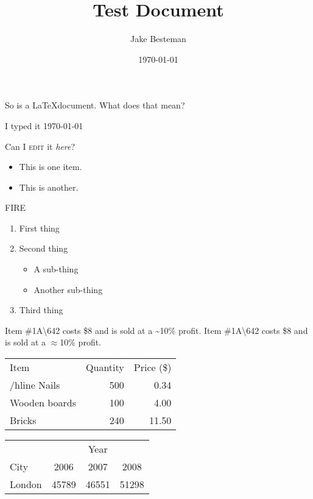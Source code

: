 \documentclass{article}
\begin{document}
\title{Test Document}
\author{Jake Besteman}
\date{\today}
\maketitle

\tableofcontents
\newpage
{}

So  is a \LaTeX document. What does that mean?

I typed it \today

Can I \textsc{edit} it \textit{here}?

\begin{itemize}
\item This is one item.
\item This is another.
\end{itemize}
{\color{red}FIRE}


\begin{enumerate}
\item First thing
\item Second thing
\begin{itemize}
\item A sub-thing
\item Another sub-thing
\end{itemize}
\item Third thing
\end{enumerate}

Item \#1A\textbackslash642 costs \$8 and is sold at a \~{}10\% profit.
Item \#1A\textbackslash642 costs \$8 and is sold at a $\approx$10\% profit.
\newline

\begin{tabular}{l|r|r}
Item & Quantity & Price (\$) \\
/hline
Nails & 500 & 0.34 \\
Wooden boards & 100 & 4.00 \\
Bricks & 240 & 11.50 \\
\end{tabular}
\newline

\begin{tabular}{l|ccc}
 & & Year & \\
\cline{2-4}
City & 2006 & 2007 & 2008 \\
\hline
London & 45789 & 46551 & 51298 \\
\end{tabular}
\end{document}
